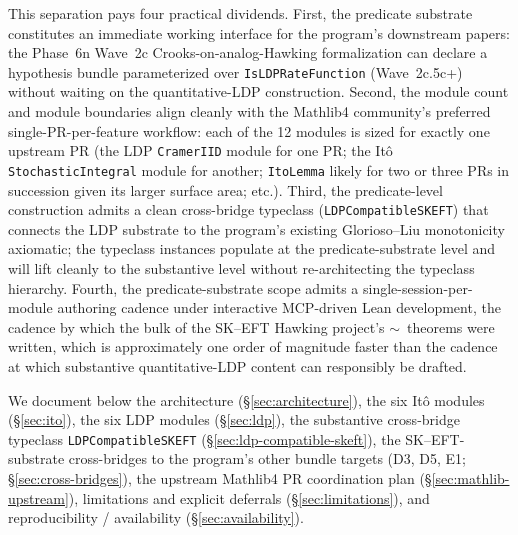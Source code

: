 \documentclass[11pt]{article}
\begin{document}
This separation pays four practical dividends. First, the predicate
substrate constitutes an immediate working interface for the
program's downstream papers: the Phase~6n Wave~2c Crooks-on-analog-Hawking
formalization can declare a hypothesis bundle parameterized over
\texttt{IsLDPRateFunction} (Wave~2c.5c+) without waiting on the
quantitative-LDP construction. Second, the module count and module
boundaries align cleanly with the Mathlib4 community's preferred
single-PR-per-feature workflow: each of the 12 modules is sized for
exactly one upstream PR (the LDP \texttt{CramerIID} module for one
PR; the It\^o \texttt{StochasticIntegral} module for another;
\texttt{ItoLemma} likely for two or three PRs in succession given
its larger surface area; etc.). Third, the predicate-level
construction admits a clean cross-bridge typeclass
(\texttt{LDPCompatibleSKEFT}) that connects the LDP substrate to
the program's existing Glorioso--Liu monotonicity axiomatic; the
typeclass instances populate at the predicate-substrate level and
will lift cleanly to the substantive level without re-architecting
the typeclass hierarchy. Fourth, the predicate-substrate scope
admits a single-session-per-module
authoring cadence under interactive MCP-driven Lean development,
the cadence by which the bulk of the SK--EFT Hawking project's
$\sim$\totaltheorems\ theorems were written, which is approximately one
order of magnitude faster than the cadence at which substantive
quantitative-LDP content can responsibly be drafted.

We document below the architecture (\S\ref{sec:architecture}), the
six It\^o modules (\S\ref{sec:ito}), the six LDP modules
(\S\ref{sec:ldp}), the substantive cross-bridge typeclass
\texttt{LDPCompatibleSKEFT} (\S\ref{sec:ldp-compatible-skeft}), the
SK--EFT-substrate cross-bridges to the program's other bundle
targets (D3, D5, E1; \S\ref{sec:cross-bridges}), the upstream
Mathlib4 PR coordination plan (\S\ref{sec:mathlib-upstream}),
limitations and explicit deferrals (\S\ref{sec:limitations}), and
reproducibility / availability (\S\ref{sec:availability}).
\end{document}
